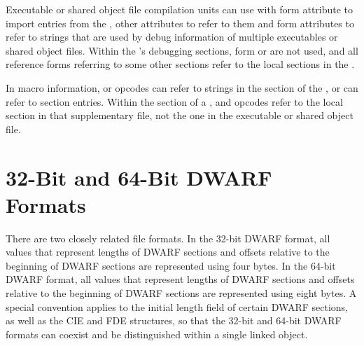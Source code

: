 Executable or shared object file compilation units can use
\DWTAGimportedunit{} with \DWFORMrefsup{} form \DWATimport{} attribute
to import entries from the , other \DWFORMrefsup{}
attributes to refer to them and \DWFORMstrpsup{} form attributes to
refer to strings that are used by debug information of multiple
executables or shared object files.  Within the 's
debugging sections, form \DWFORMrefsup{} or \DWFORMstrpsup{} are
not used, and all reference forms referring to some other sections
refer to the local sections in the .

In macro information, \DWMACROdefinesup{} or
\DWMACROundefsup{} opcodes can refer to strings in the 
\dotdebugstr{} section of the , 
or \DWMACROimportsup{} 
can refer to \dotdebugmacro{} section entries.  Within the 
\dotdebugmacro{} section of a , 
\DWMACROdefinestrp{} and \DWMACROundefstrp{}
opcodes refer to the local \dotdebugstr{} section in that
supplementary file, not the one in
the executable or shared object file.


\section{32-Bit and 64-Bit DWARF Formats}
\label{datarep:32bitand64bitdwarfformats}
\hypertarget{datarep:xxbitdwffmt}{}
There are two closely related file formats. In the 32-bit DWARF
format, all values that represent lengths of DWARF sections
and offsets relative to the beginning of DWARF sections are
represented using four bytes. In the 64-bit DWARF format, all
values that represent lengths of DWARF sections and offsets
relative to the beginning of DWARF sections are represented
using eight bytes. A special convention applies to the initial
length field of certain DWARF sections, as well as the CIE and
FDE structures, so that the 32-bit and 64-bit DWARF formats
can coexist and be distinguished within a single linked object.

